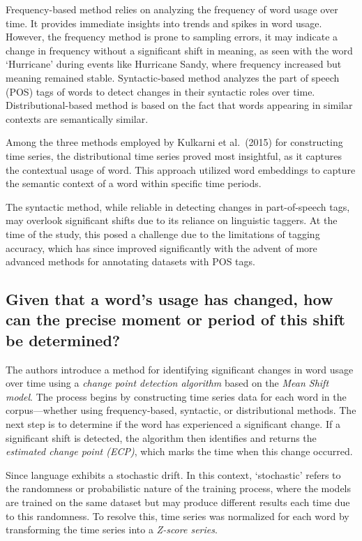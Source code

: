 Frequency-based method relies on analyzing the frequency of word usage over time.
It provides immediate insights into trends and spikes in word usage.
However, the frequency method is prone to sampling errors, it may indicate a change in frequency without a significant shift in meaning,
as seen with the word `Hurricane' during events like Hurricane Sandy, where frequency increased but meaning remained stable.
Syntactic-based method analyzes the part of speech (POS) tags of words to detect changes in their syntactic roles over time.
Distributional-based method is based on the fact that words appearing in similar contexts are semantically similar.

Among the three methods employed by Kulkarni et al.\ (2015) for constructing time series,
the distributional time series proved most insightful, as it captures the contextual usage of word.
This approach utilized word embeddings to capture the semantic context of a word within specific time periods.

The syntactic method, while reliable in detecting changes in part-of-speech tags, may overlook significant shifts due to its reliance on linguistic taggers.
At the time of the study, this posed a challenge due to the limitations of tagging accuracy, which has since improved significantly with the advent of more advanced methods for annotating datasets with POS tags.


\subsection{Given that a word's usage has changed, how can the precise moment or period of this shift be determined?} \label{subsec:kulkarni-rq2}
The authors introduce a method for identifying significant changes in word usage over time using a \emph{change point detection algorithm} based on the \emph{Mean Shift model}.
The process begins by constructing time series data for each word in the corpus—whether using frequency-based, syntactic, or distributional methods.
The next step is to determine if the word has experienced a significant change.
If a significant shift is detected, the algorithm then identifies and returns the \emph{estimated change point (ECP)}, which marks the time when this change occurred.

Since language exhibits a stochastic drift.
In this context, `stochastic' refers to the randomness or probabilistic nature of the training process,
where the models are trained on the same dataset but may produce different results each time due to this randomness.
To resolve this, time series was normalized for each word by transforming the time series into a \emph{Z-score series}.

